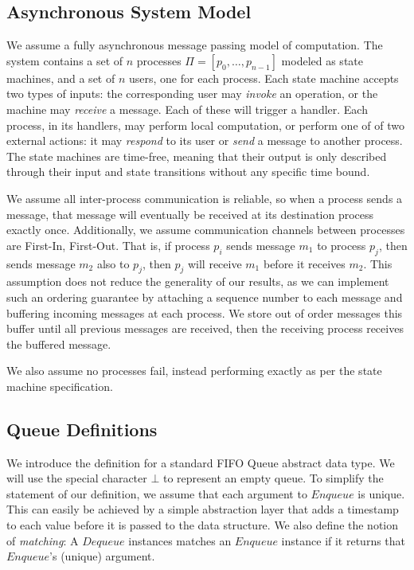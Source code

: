 \documentclass[a4paper,USenglish]{lipics-v2021} %
\begin{document}
\subsection{Asynchronous System Model}
We assume a fully asynchronous message passing model of computation.  The system contains a set of $n$ processes $\Pi = [p_0, \dots , p_{n-1}]$ modeled as state machines, and a set of $n$ users, one for each process.  Each state machine accepts two types of inputs: the corresponding user may \emph{invoke} an operation, or the machine may \emph{receive} a message.  Each of these will trigger a handler.  Each process, in its handlers, may perform local computation, or perform one of of two external actions: it may \emph{respond} to its user or \emph{send} a message to another process.  The state machines are time-free, meaning that their output is only described through their input and state transitions without any specific time bound.

We assume all inter-process communication is reliable, so when a process sends a message, that message will eventually be received at its destination process exactly once.  Additionally, we assume communication channels between processes are First-In, First-Out.  That is, if process $p_i$ sends message $m_1$ to process $p_j$, then sends message $m_2$ also to $p_j$, then $p_j$ will receive $m_1$ before it receives $m_2$.  This assumption does not reduce the generality of our results, as we can implement such an ordering guarantee by attaching a sequence number to each message and buffering incoming messages at each process.  We store out of order messages this buffer until all previous messages are received, then the receiving process receives the buffered message.

We also assume no processes fail, instead performing exactly as per the state machine specification.  

\subsection{Queue Definitions}

We introduce the definition for a standard FIFO Queue abstract data type. We will use the special character $\bot$ to represent an empty queue.    To simplify the statement of our definition, we assume that each argument to $Enqueue$ is unique. This can easily be achieved by a simple abstraction layer that adds a timestamp to each value before it is passed to the data structure.  We also define the notion of \emph{matching}: A $Dequeue$ instances matches an $Enqueue$ instance if it returns that $Enqueue$'s (unique) argument.  
\end{document}
